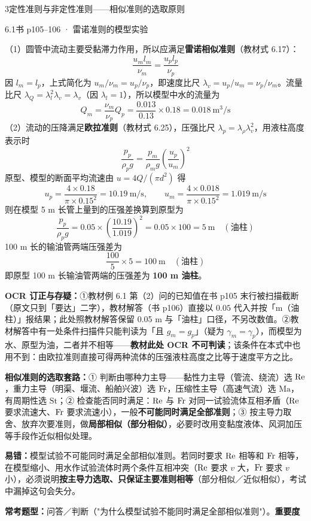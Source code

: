 \begin{kaodian}{3}{定性准则与非定性准则——相似准则的选取原则}
\begin{liti}{6.1}{书 p105--106 · 雷诺准则的模型实验}
\begin{jie}
（1）圆管中流动主要受黏滞力作用，所以应满足\textbf{雷诺相似准则}（教材式 6.17）：
\[ \frac{u_m l_m}{\nu_m}=\frac{u_p l_p}{\nu_p} \]
因 $l_m=l_p$，上式简化为 $u_m/\nu_m=u_p/\nu_p$，即速度比尺 $\lambda_v=u_p/u_m=\nu_p/\nu_m$。流量比尺 $\lambda_Q=\lambda_l^{2}\lambda_v=\lambda_v$（因 $\lambda_l=1$），所以模型中水的流量为
\[ Q_m=\frac{\nu_m}{\nu_p}Q_p=\frac{0.013}{0.13}\times 0.18=0.018\ \mathrm{m^{3}/s} \]
（2）流动的压降满足\textbf{欧拉准则}（教材式 6.25），压强比尺 $\lambda_p=\lambda_\rho\lambda_v^{2}$，用液柱高度表示时
\[ \frac{p_p}{\rho_p g}=\frac{p_m}{\rho_m g}\left(\frac{u_p}{u_m}\right)^{2} \]
原型、模型的断面平均流速由 $u=4Q/(\pi d^{2})$ 得
\[ u_p=\frac{4\times 0.18}{\pi\times 0.15^{2}}=10.19\ \mathrm{m/s},\qquad u_m=\frac{4\times 0.018}{\pi\times 0.15^{2}}=1.019\ \mathrm{m/s} \]
则在模型 5 m 长管上量到的压强差换算到原型为
\[ \frac{p_p}{\rho_p g}=0.05\times\left(\frac{10.19}{1.019}\right)^{2}=0.05\times 100=5\ \mathrm{m}\quad(\text{油柱}) \]
100 m 长的输油管两端压强差为
\[ \frac{100}{5}\times 5=100\ \mathrm{m}\quad(\text{油柱}) \]
即原型 100 m 长输油管两端的压强差为 \textbf{100 m 油柱}。
\end{jie}

\begin{tishi}
\textbf{OCR 订正与存疑：}①教材例 6.1 第（2）问的已知值在书 p105 末行被扫描截断（原文只到「要达」二字），教材解答（书 p106）直接以 $0.05$ 代入并按「m（油柱）」报结果；此处照教材解答保留 0.05 m 与「油柱」口径，不另改数值。②教材解答中有一处条件扫描件只能判读为「且 $g_m=g_p$」（疑为 $\gamma_m=\gamma_p$），而模型为水、原型为油，二者并不相等——\textbf{教材此处 OCR 不可判读}；该条件在本式中也用不到：由欧拉准则直接可得两种流体的压强液柱高度之比等于速度平方之比。
\end{tishi}
\end{liti}

\begin{banfa}
\textbf{相似准则的选取套路：}① 判断由哪种力主导——黏性力主导（管流、绕流）选 $\mathrm{Re}$，重力主导（明渠、堰流、船舶兴波）选 $\mathrm{Fr}$，压缩性主导（高速气流）选 $\mathrm{Ma}$，有周期性选 $\mathrm{St}$；② 检查能否同时满足：$\mathrm{Re}$ 与 $\mathrm{Fr}$ 对同一试验流体互相矛盾（$\mathrm{Re}$ 要求流速大、$\mathrm{Fr}$ 要求流速小），一般\textbf{不可能同时满足全部准则}；③ 按主导力取舍、放弃次要准则，做\textbf{局部相似（部分相似）}，必要时改用变黏度液体、风洞加压等手段作近似相似处理。
\end{banfa}

\begin{yicuo}
\textbf{易错：}模型试验不可能同时满足全部相似准则。若同时要求 $\mathrm{Re}$ 相等和 $\mathrm{Fr}$ 相等，在模型缩小、用水作试验流体时两个条件互相冲突（$\mathrm{Re}$ 要求 $v$ 大，$\mathrm{Fr}$ 要求 $v$ 小），必须说明\textbf{按主导力选取、只保证主要准则相等}（部分相似／近似相似），考试中漏掉这句会失分。
\end{yicuo}

\textbf{常考题型：}问答／判断（"为什么模型试验不能同时满足全部相似准则"）。\quad\textbf{重要度 }\quad{}\quad{}
\end{kaodian}

